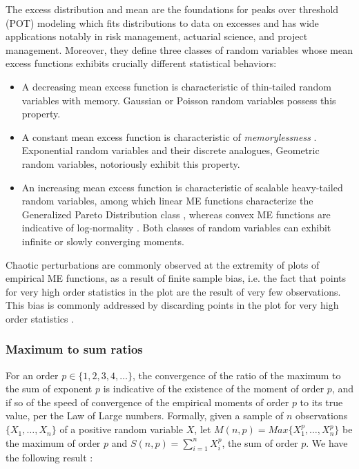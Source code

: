 \documentclass[12pt]{article}
\begin{document}
The excess distribution and mean are the foundations for peaks over threshold (POT) modeling \cite{mef2} which fits distributions to data on excesses and has wide applications notably in risk management, actuarial science, and project management. Moreover, they define three classes of random variables whose mean excess functions exhibits crucially different statistical behaviors:
\begin{itemize}
    \item A decreasing mean excess function is characteristic of thin-tailed random variables with memory.  Gaussian or Poisson random variables possess this property. 
    \item A constant mean excess function is characteristic of \textit{memorylessness} \cite{memoryless}. Exponential random variables and their discrete analogues, Geometric random variables, notoriously exhibit this property. 
       \item An increasing mean excess function is characteristic of scalable heavy-tailed random variables, among which linear ME functions characterize the Generalized Pareto Distribution class \cite{evt1}, whereas convex ME functions are indicative of log-normality \cite{cirillo}. Both classes of random variables can exhibit infinite or slowly converging moments.
       
\end{itemize}




Chaotic perturbations are commonly observed at the extremity of plots of empirical ME functions, as a result of finite sample bias, i.e. the fact that points for very high order statistics in the plot are the result of very few observations. This bias is commonly addressed by discarding points in the plot for very high order statistics \cite{ghosh}.

\subsubsection{Maximum to sum ratios}


 For an order $p \in \{1,2,3,4,\dots\}$, the convergence of the ratio of the maximum to the sum of exponent $p$ is indicative of the existence of the moment of order $p$, and if so of the speed of convergence of the empirical moments of order $p$ to its true value, per the Law of Large numbers. Formally, given a sample of $n$ observations $\{X_1,\dots,X_n\}$ of a positive random variable $X$, let $M(n,p)=Max\{X_1^p, \dots, X_n^p\}$ be the maximum of order $p$ and $S(n,p)=\sum\limits_{i=1}^n X_i^p$, the sum of order $p$. We have the following result \cite{evt1, cirillo, cirilloplos}:
\end{document}
